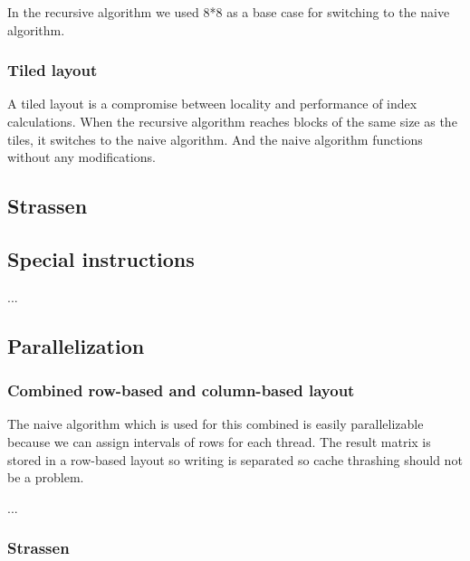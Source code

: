 In the recursive algorithm we used 8*8 as a base case for switching to the naive algorithm.


\subsubsection{Tiled layout}

A tiled layout is a compromise between locality and performance of index calculations. When the recursive algorithm reaches blocks of the same size as the tiles, it switches to the naive algorithm. And the naive algorithm functions without any modifications.

\subsection{Strassen}



\subsection{Special instructions}

...

\subsection{Parallelization}

\subsubsection{Combined row-based and column-based layout}

The naive algorithm which is used for this combined is easily parallelizable because we can assign intervals of rows for each thread. The result matrix is stored in a row-based layout so writing is separated so cache thrashing should not be a problem.

...



\subsubsection{Strassen}